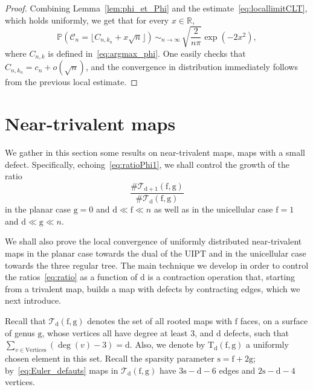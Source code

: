 \documentclass[JEP,XML,SOM,Unicode,NoFloatCountersInSection,NoEqCountersInSection]{cedram}
\theoremstyle{plain}
\theoremstyle{definition}
\theoremstyle{remark}
\newcommand{\R}{\mathbb{R}}
\renewcommand{\P}{\mathbb{P}}
\newcommand{\Triv}{\mathrm{T}}
\newcommand{\face}{\mathrm{f}}
\newcommand{\defect}{\mathrm{d}}
\newcommand{\gen}{\mathrm{g}}
\newcommand{\spar}{\mathrm{s}}
\newcommand{\equi}[1][n]{\,\mathop{\sim}^{}_{#1 \to \infty}\,}
\begin{document}
\begin{proof}
Combining Lemma~\ref{lem:phi_et_Phi} and the estimate~\eqref{eq:locallimitCLT}, which holds uniformly,
we get that for every $x\in\R$,\vspace*{-3pt}
\[
\P(\mathcal{C}_{n}=\lfloor C_{n,k_{n}}+x\sqrt{n} \rfloor) \equi \sqrt{\frac{2}{n\pi}} \exp\left(-2 x^{2}\right),
\]
where $C_{n,k}$ is defined in~\eqref{eq:argmax_phi}. One easily checks that $C_{n,k_{n}} = c_n + o(\sqrt{n})$, and the convergence in distribution immediately follows from the previous local estimate.
\end{proof}

\section{Near-trivalent maps}
\label{sec:defauts_bis}

We gather in this section some results on near-trivalent maps, \ie maps with a small defect. Specifically, echoing~\eqref{eq:ratioPhi1}, we shall control the growth of the ratio\vspace*{-3pt}
\begin{equation}\label{eq:ratio}
\frac{\# \mathcal{T}_{\defect+1}(\face, \gen)}{ \# \mathcal{T}_{\defect}(\face, \gen)}
\end{equation}
in the planar case $\gen=0$ and $\defect \ll \face \ll n$ as well as in the unicellular case $\face=1$ and $\defect \ll \gen \ll n$.

We shall also prove the local convergence of uniformly distributed near-trivalent maps in the planar case towards the dual of the UIPT and in the unicellular case towards the three regular tree. The main technique we develop in order to control the ratios~\eqref{eq:ratio} as a function of $ \defect$ is a contraction operation that, starting from a trivalent map, builds a map with defects by contracting edges, which we next introduce.

Recall that $\mathcal{T}_{\defect}{(\face,\gen)}$ denotes the set of all rooted maps with $ \face$ faces, on a surface of genus $ \gen$, whose vertices all have degree at least $3$, and $\defect$ defects, \ie such that $\sum_{v \in \mathrm{Vertices}} (\deg(v)-3) = \defect$. Also, we denote by $\Triv_{ \defect}(\face,\gen)$ a uniformly chosen element in this set.
Recall the sparsity parameter $\spar=\face+2\gen$; by~\eqref{eq:Euler_defauts} maps in $\mathcal{T}_{\defect}{(\face,\gen)}$ have $3\spar-\defect-6$ edges and $2\spar-\defect-4$ vertices.
\end{document}
